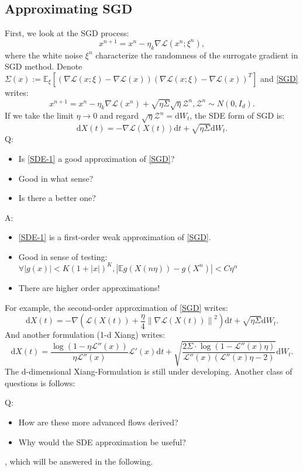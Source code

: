 \subsection{Approximating SGD}
First, we look at the SGD process:
\begin{equation}
    x^{n+1} = x^{n} - \eta_{k} \nabla \mathcal{L} (x^n; \xi^n),\tag{ SGD}
    \label{SGD}
\end{equation}
where the white noise $\xi^n$ characterize the randomness of the surrogate gradient in SGD method. Denote $\Sigma (x):=\mathbb{E}_{\xi}\left[\left( \nabla\mathcal{L}(x;\xi)- \nabla\mathcal{L}(x)\right)\left(\nabla\mathcal{L}(x;\xi)- \nabla\mathcal{L}(x)\right)^T  \right]   $ and \ref{SGD} writes:
$$
    x^{n+1} = x^{n} - \eta_{k} \nabla \mathcal{L} (x^n) + \sqrt{\eta \Sigma}  \sqrt{\eta} \mathcal{Z}^n, \mathcal{Z}^n\sim N(0,I_d).
$$
If we take the limit $\eta\rightarrow 0$ and regard $\sqrt{\eta} \mathcal{Z} ^n = \mathrm{d} W_t$, the SDE form of SGD is:
\begin{equation}
    \mathrm{d}X(t) = -\nabla\mathcal{L}(X(t))\mathrm{d}t+\sqrt{\eta \Sigma}\mathrm{d} W_t.\tag{ SDE-1}
    \label{SDE-1}
\end{equation}
Q: 
\begin{itemize}
    \item Is \ref{SDE-1} a good approximation of \ref{SGD}? 
    \item Good in what sense? 
    \item Is there a better one?
\end{itemize}
A: 
\begin{itemize}
    \item \ref{SDE-1} is a first-order weak approximation of \ref{SGD}. 
    \item Good in sense of testing: $\forall \left\lvert g(x)\right\rvert < K(1+\left\lvert x\right\rvert )^K , \left\lvert \mathbb{E} g(X(n\eta))-g(X^n)\right\rvert<C\eta^\alpha $
    \item There are higher order approximations!
\end{itemize}
For example, the second-order approximation of \ref{SGD} writes:
\begin{equation}
    \mathrm{d}X(t) = -\nabla \left(\mathcal{L}(X(t)) +\frac{\eta}{4}\left\lVert\nabla\mathcal{L}(X(t)) \right\rVert^2  \right)  \mathrm{d}t+\sqrt{\eta \Sigma}\mathrm{d} W_t.\tag{ SDE-2}
    \label{SDE-2}
\end{equation}
And another formulation (1-d Xiang) writes:
\begin{equation}
    \mathrm{d}X(t) = \frac{\log(1-\eta\mathcal{L}''(x))}{\eta\mathcal{L}''(x)}\mathcal{L}'(x) \mathrm{d}t + \sqrt{\frac{2\Sigma \cdot\log(1-\mathcal{L}''(x)\eta)}{\mathcal{L}''(x)(\mathcal{L}''(x)\eta-2)}}\mathrm{d}W_t.\tag{ SDE-Xiang-1-dim}
    \label{SDE-Xiang}
\end{equation}
The d-dimensional Xiang-Formulation is still under developing.
Another class of questions is follows:

Q: 
\begin{itemize}
    \item How are these more advanced flows derived?
    \item Why would the SDE approximation be useful?
\end{itemize}
, which will be answered in the following.




